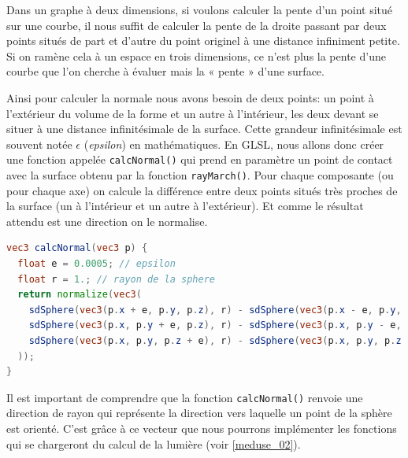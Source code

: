 Dans un graphe à deux dimensions, si voulons calculer la pente d'un point situé sur une courbe, il nous suffit de calculer la pente de la droite passant par deux points situés de part et d'autre du point originel à une distance infiniment petite. Si on ramène cela à un espace en trois dimensions, ce n'est plus la pente d'une courbe que l'on cherche à évaluer mais la « pente » d'une surface.

Ainsi pour calculer la normale nous avons besoin de deux points: un point à l'extérieur du volume de la forme et un autre à l'intérieur, les deux devant se situer à une distance infinitésimale de la surface. Cette grandeur infinitésimale est souvent notée $\epsilon$ (\textit{epsilon}) en mathématiques. En GLSL, nous allons donc créer une fonction appelée \lstinline{calcNormal()} qui prend en paramètre un point de contact avec la surface obtenu par la fonction \lstinline{rayMarch()}. Pour chaque composante (ou pour chaque axe) on calcule la différence entre deux points situés très proches de la surface (un à l'intérieur et un autre à l'extérieur). Et comme le résultat attendu est une direction on le normalise.

\begin{minipage}{\linewidth}
\begin{lstlisting}[language=GLSL, caption=Calcul de la normale,captionpos=b,frame=single]
vec3 calcNormal(vec3 p) {
  float e = 0.0005; // epsilon
  float r = 1.; // rayon de la sphere
  return normalize(vec3(
    sdSphere(vec3(p.x + e, p.y, p.z), r) - sdSphere(vec3(p.x - e, p.y, p.z), r),
    sdSphere(vec3(p.x, p.y + e, p.z), r) - sdSphere(vec3(p.x, p.y - e, p.z), r),
    sdSphere(vec3(p.x, p.y, p.z + e), r) - sdSphere(vec3(p.x, p.y, p.z - e), r)
  ));
}
\end{lstlisting}
\end{minipage}

Il est important de comprendre que la fonction \lstinline{calcNormal()} renvoie une direction de rayon qui représente la direction vers laquelle un point de la sphère est orienté. C'est grâce à ce vecteur que nous pourrons implémenter les fonctions qui se chargeront du calcul de la lumière (voir \ref{meduse_02}).

